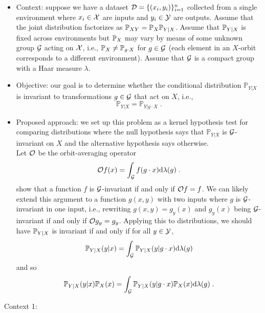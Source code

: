\begin{itemize}

\item
Context: suppose we have a dataset $\mathcal{D}=\{(x_i,y_i)\}_{i=1}^n$ collected from a single environment where $x_i\in\mathcal{X}$ are inputs and $y_i\in\mathcal{Y}$ are outputs. Assume that the joint distribution factorizes as $\mathbb{P}_{XY}=\mathbb{P}_X\mathbb{P}_{Y|X}$. Assume that $\mathbb{P}_{Y|X}$ is fixed across environments but $\mathbb{P}_X$ may vary by means of some unknown group $\mathcal{G}$ acting on $\mathcal{X}$, i.e., $\mathbb{P}_X\neq\mathbb{P}_{g\cdot X}$ for $g\in\mathcal{G}$ (each element in an $X$-orbit corresponds to a different environment). Assume that $\mathcal{G}$ is a compact group with a Haar measure $\lambda$.

\item
Objective: our goal is to determine whether the conditional distribution $\mathbb{P}_{Y|X}$ is invariant to transformations $g\in\mathcal{G}$ that act on $X$, i.e.,
\[
\mathbb{P}_{Y|X}=\mathbb{P}_{Y|g\cdot X}\;.
\]

\item
Proposed approach: we set up this problem as a kernel hypothesis test for comparing distributions where the null hypothesis says that $\mathbb{P}_{Y|X}$ is $\mathcal{G}$-invariant on $X$ and the alternative hypothesis says otherwise.
\\

Let $\mathcal{O}$ be the orbit-averaging operator \parencite{Elesedy:2021}
\[
\mathcal{O} f(x) = \int_{\mathcal{G}} f(g\cdot x)\mathrm{d}\lambda(g)\;.
\]
\parencite{Elesedy:2021,Elesedy:2021:equivariant} show that a function $f$ is $\mathcal{G}$-invariant if and only if $\mathcal{O} f=f$. We can likely extend this argument to a function $g(x,y)$ with two inputs where $g$ is $\mathcal{G}$-invariant in one input, i.e., rewriting $g(x,y)=g_y(x)$ and $g_y(x)$ being $\mathcal{G}$-invariant if and only if $\mathcal{O} g_y = g_y$. Applying this to distributions, we should have $\mathbb{P}_{Y|X}$ is invariant if and only if for all $y\in\mathcal{Y}$,
\[
\mathbb{P}_{Y|X}(y|x)=\int_{\mathcal{G}}\mathbb{P}_{Y|X}(y|g\cdot x)\mathrm{d}\lambda(g)
\]
and so
\[
\mathbb{P}_{Y|X}(y|x)\mathbb{P}_X(x)=\int_{\mathcal{G}}\mathbb{P}_{Y|X}(y|g\cdot x)\mathbb{P}_X(x)\mathrm{d}\lambda(g) \;.
\]


\end{itemize}


\todo

Context 1:

